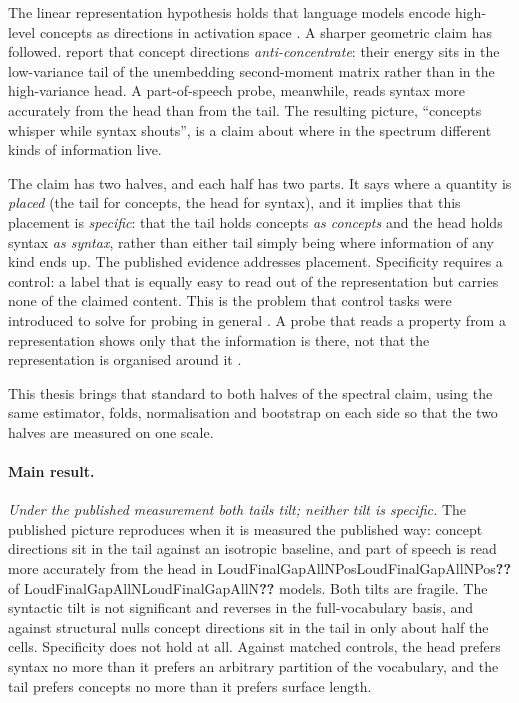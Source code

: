 \documentclass[11pt]{report}
\newcommand{\num}[1]{\ifcsname #1\endcsname\csname #1\endcsname\else\textbf{??}\fi}
\begin{document}
The linear representation hypothesis holds that language models encode
high-level concepts as directions in activation space
\citep{park2024linear,mikolov2013efficient}. A sharper geometric claim has
followed. \citet{acharya2026concepts} report that concept directions
\emph{anti-concentrate}: their energy sits in the low-variance tail of the
unembedding second-moment matrix rather than in the high-variance head. A
part-of-speech probe, meanwhile, reads syntax more accurately from the head than
from the tail. The resulting picture, ``concepts whisper while syntax shouts'',
is a claim about where in the spectrum different kinds of information live.

The claim has two halves, and each half has two parts. It says where a quantity
is \emph{placed} (the tail for concepts, the head for syntax), and it implies
that this placement is \emph{specific}: that the tail holds concepts \emph{as
concepts} and the head holds syntax \emph{as syntax}, rather than either tail
simply being where information of any kind ends up. The published evidence
addresses placement. Specificity requires a control: a label that is equally
easy to read out of the representation but carries none of the claimed content.
This is the problem that control tasks were introduced to solve for probing in
general \citep{hewitt2019designing}. A probe that reads a property from a
representation shows only that the information is there, not that the
representation is organised around it \citep{belinkov2022probing,
ravichander2021probing,elazar2021amnesic}.

This thesis brings that standard to both halves of the spectral claim, using the
same estimator, folds, normalisation and bootstrap on each side so that the two
halves are measured on one scale.

\paragraph{Main result.} \emph{Under the published measurement both tails
tilt; neither tilt is specific.} The published picture reproduces when it is
measured the published way: concept directions sit in the tail against an
isotropic baseline, and part of speech is read more accurately from the head in
\num{LoudFinalGapAllNPos}{} of \num{LoudFinalGapAllN}{} models. Both tilts are
fragile. The syntactic tilt is not significant and reverses in the
full-vocabulary basis, and against structural nulls concept directions sit in
the tail in only about half the cells. Specificity does not hold at all. Against matched controls, the head prefers syntax no more than it prefers an
arbitrary partition of the vocabulary, and the tail prefers concepts no more than
it prefers surface length.
\end{document}
